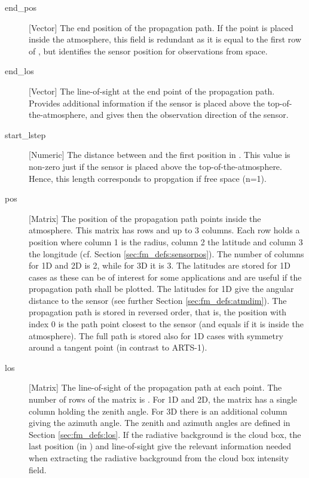 \begin{description}
   \item[end\_pos] [Vector] The end position of the propagation path. If
     the point is placed inside the atmosphere, this field is redundant as it
     is equal to the first row of , but identifies the sensor
     position for observations from space.

   \item[end\_los] [Vector] The line-of-sight at the end point of the
     propagation path. Provides additional information if the sensor is placed
     above the top-of-the-atmosphere, and gives then the observation direction
     of the sensor.

   \item[start\_lstep] [Numeric] The distance between 
     and the first position in . This value is non-zero just if
     the sensor is placed above the top-of-the-atmosphere. Hence, this length
     corresponds to propgation if free space (n=1).

   \item[pos] [Matrix] The position of the propagation path points inside the
     atmosphere. This matrix has  rows and up to 3 columns. Each
     row holds a position where column 1 is the radius, column 2 the latitude
     and column 3 the longitude (cf. Section \ref{sec:fm_defs:sensorpos}). The
     number of columns for 1D and 2D is 2, while for 3D it is 3. The latitudes
     are stored for 1D cases as these can be of interest for some applications
     and are useful if the propagation path shall be plotted. The latitudes for
     1D give the angular distance to the sensor (see further Section
     \ref{sec:fm_defs:atmdim}). The propagation path is stored in reversed
     order, that is, the position with index 0 is the path point closest to the
     sensor (and equals  if it is inside the atmosphere).
     The full path is stored also for 1D cases with symmetry around a tangent
     point (in contrast to ARTS-1).
     
   \item[los] [Matrix] The line-of-sight of the propagation path at
     each point. The number of rows of the matrix is .
     For 1D and 2D, the matrix has a single column holding the zenith
     angle. For 3D there is an additional column giving the azimuth
     angle. The zenith and azimuth angles are defined in
     Section \ref{sec:fm_defs:los}. If the radiative background is the
     cloud box, the last position (in ) and
     line-of-sight give the relevant information needed when
     extracting the radiative background from the cloud box intensity
     field.
     

\end{description}
